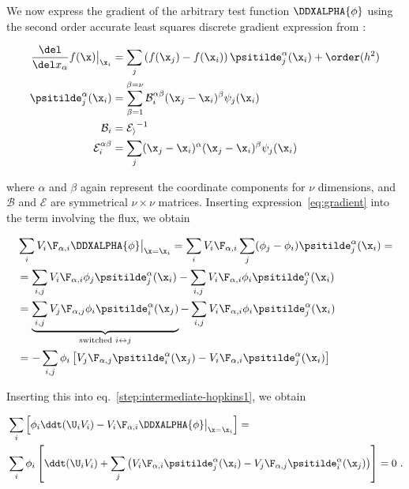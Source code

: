 We now express the gradient of the arbitrary test function $\DDXALPHA{\phi}$ using the second order
accurate least squares discrete gradient expression from
\cite{lansonRenormalizedMeshfreeSchemes2008a}:

\begin{align}
	\frac{\del}{\del x_{\alpha}} f(\x) \big{|}_{\x_i} &=
	\sum_j \left( f(\x_j) - f(\x_i) \right) \psitilde_j^\alpha (\x_i) + \order(h^2)
\label{eq:gradient} \\
	\psitilde_j^\alpha (\x_i) &= \sum_{\beta = 1}^{\beta=\nu} \mathcal{B}_i^{\alpha \beta}
	(\x_j - \x_i)^\beta \psi_j(\x_i) \label{eq:psitilde} \\
	\mathcal{B}_i &= \mathcal{E_i} ^ {-1} \label{eq:matrix_B}\\
	\mathcal{E}_i^{\alpha \beta} &= \sum_j (\x_j - \x_i)^\alpha (\x_j - \x_i)^\beta \psi_j(\x_i)
\label{eq:matrix_E}
\end{align}

where $\alpha$ and $\beta$ again represent the coordinate components for $\nu$ dimensions, and
$\mathcal{B}$ and $\mathcal{E}$ are symmetrical $\nu \times \nu$ matrices.
Inserting expression~\ref{eq:gradient} into the term involving the flux, we obtain

\begin{align}
& \sum_i V_i \F_{\alpha, i} \DDXALPHA{\phi}\big|_{\x = \x_i} =
    \sum_i V_i \F_{\alpha, i} \sum_j (\phi_j - \phi_i) \psitilde_j^\alpha (\x_i) = \\
&= \sum_{i,j} V_i \F_{\alpha, i} \phi_j \psitilde_j^\alpha (\x_i) -
    \sum_{i,j} V_i \F_{\alpha, i} \phi_i \psitilde_j^\alpha (\x_i) \\
&= \underbrace{\sum_{i,j} V_j \F_{\alpha, j} \phi_i \psitilde_i^\alpha (\x_j)}_{\text{switched } i
\leftrightarrow j} -
    \sum_{i,j} V_i \F_{\alpha, i} \phi_i \psitilde_j^\alpha (\x_i) \\
&= - \sum_{i,j} \phi_i \left[ V_j \F_{\alpha, j} \psitilde_i^\alpha (\x_j)
    - V_i \F_{\alpha, i} \psitilde_j^\alpha (\x_i) \right]
\end{align}


Inserting this into eq.~\ref{step:intermediate-hopkins1}, we obtain

\begin{align}
&\sum_i \left[ \phi_i \ddt (\U_i V_i) -
    V_i \F_{\alpha,i} \DDXALPHA{\phi} \big|_{\x = \x_i} \right] =  \\
&\sum_i \phi_i \left[ \ddt (\U_i V_i) + \sum_j
        \left( V_i \F_{\alpha, i} \psitilde_j^\alpha (\x_i)
        - V_j \F_{\alpha, j} \psitilde_i^\alpha (\x_j) \right)
    \right] = 0 \ .
\end{align}

